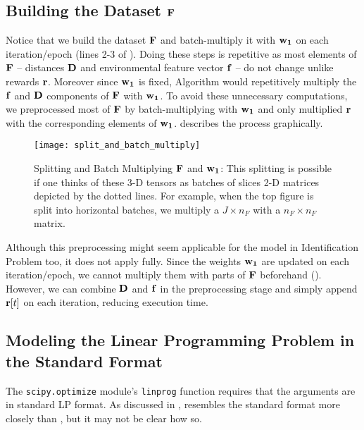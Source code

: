 \subsection{Building the Dataset $\tens{F}$} \label{app:Building the Dataset F}
Notice that we build the dataset $\tens{F}$ and batch-multiply it with $\matr{w_1}$ on each iteration/epoch (lines 2-3 of ). Doing these steps is repetitive as most elements of $\tens{F}$ -- distances $\mathbf{D}$ and environmental feature vector $\mathbf{f}$ -- do not change unlike rewards $\mathbf{r}$. Moreover since $\matr{w_1}$ is fixed, Algorithm  would repetitively multiply the $\mathbf{f}$ and $\mathbf{D}$ components of $\tens{F}$ with $\matr{w_1}$. To avoid these unnecessary computations, we preprocessed most of $\tens{F}$ by batch-multiplying with $\matr{w_1}$ and only multiplied $\mathbf{r}$ with the corresponding elements of $\matr{w_1}$.  describes the process graphically.
\begin{figure}[!htbp]
    \centering
    \texttt{[image: split\_and\_batch\_multiply]}
    \caption[Splitting and Batch Multiplying $\tens{F}$ and $\matr{w_1}$]{Splitting and Batch Multiplying $\tens{F}$ and $\matr{w_1}$: This splitting is possible if one thinks of these 3-D tensors as batches of slices 2-D matrices depicted by the dotted lines. For example, when the top figure is split into horizontal batches, we multiply a $J \times n_F$ with a $n_F \times n_F$ matrix.}
    \label{fig:Splitting and Batch Multiplying F and w1}
\end{figure}    
Although this preprocessing might seem applicable for the model in Identification Problem too, it does not apply fully. Since the weights $\matr{w_1}$ are updated on each iteration/epoch, we cannot multiply them with parts of $\tens{F}$ beforehand (). However, we can combine $\mathbf{D}$ and $\mathbf{f}$ in the preprocessing stage and simply append $\mathbf{r}[t]$ on each iteration, reducing execution time.

\subsection{Modeling the Linear Programming Problem in the Standard Format} \label{app:Modeling the Linear Programming Problem in the Standard Format}
The \texttt{scipy.optimize} module's \texttt{linprog} function requires that the arguments are in standard LP format. As discussed in ,  resembles the standard format more closely than , but it may not be clear how so.

